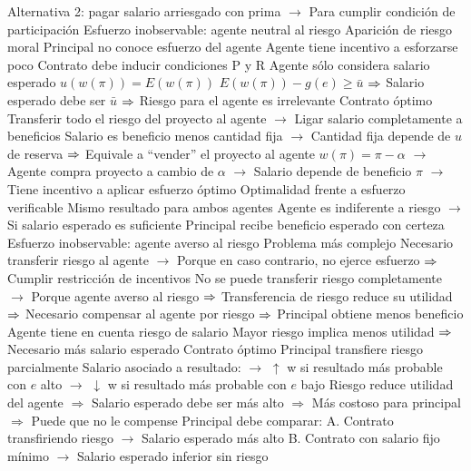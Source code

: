 \documentclass{nuevotema}
\begin{document}
\begin{esquemal}
				\4[] Alternativa 2: pagar salario arriesgado con prima
				\4[] $\to$ Para cumplir condición de participación
			\3 Esfuerzo inobservable: agente neutral al riesgo
				\4 Aparición de riesgo moral
				\4[] Principal no conoce esfuerzo del agente
				\4[] Agente tiene incentivo a esforzarse poco
				\4[$\then$] Contrato debe inducir condiciones P y R
				\4 Agente sólo considera salario esperado
				\4[] $u(w(\pi)) = E(w(\pi))$
				\4[] $E(w(\pi)) - g(e) \ge \bar{u}$
				\4[] $\then$ Salario esperado debe ser $\bar{u}$
				\4[] $\then$ Riesgo para el agente es irrelevante
				\4 Contrato óptimo
				\4[] Transferir todo el riesgo del proyecto al agente
				\4[] $\to$ Ligar salario completamente a beneficios
				\4[] Salario es beneficio menos cantidad fija
				\4[] $\to$ Cantidad fija depende de $u$ de reserva
				\4[] $\then$ Equivale a ``vender'' el proyecto al agente
				\4[] $w(\pi) = \pi - \alpha$
				\4[] $\to$ Agente compra proyecto a cambio de $\alpha$
				\4[] $\to$ Salario depende de beneficio $\pi$
				\4[] $\to$ Tiene incentivo a aplicar esfuerzo óptimo
				\4 Optimalidad frente a esfuerzo verificable
				\4[] Mismo resultado para ambos agentes
				\4[] Agente es indiferente a riesgo
				\4[] $\to$ Si salario esperado es suficiente
				\4[] Principal recibe beneficio esperado con certeza
			\3 Esfuerzo inobservable: agente averso al riesgo
				\4 Problema más complejo
				\4[] Necesario transferir riesgo al agente
				\4[] $\to$ Porque en caso contrario, no ejerce esfuerzo
				\4[] $\then$ Cumplir restricción de incentivos
				\4[] No se puede transferir riesgo completamente
				\4[] $\to$ Porque agente averso al riesgo
				\4[] $\then$ Transferencia de riesgo reduce su utilidad
				\4[] $\then$ Necesario compensar al agente por riesgo
				\4[] $\then$ Principal obtiene menos beneficio
				\4 Agente tiene en cuenta riesgo de salario
				\4[] Mayor riesgo implica menos utilidad
				\4[] $\then$ Necesario más salario esperado
				\4 Contrato óptimo
				\4[] Principal transfiere riesgo parcialmente
				\4[] Salario asociado a resultado:
				\4[] $\to$ $\uparrow$ w si resultado más probable con $e$ alto
				\4[] $\to$ $\downarrow$ w si resultado más probable con $e$ bajo
				\4[] Riesgo reduce utilidad del agente
				\4[] $\Rightarrow$ Salario esperado debe ser más alto
				\4[] $\Rightarrow$ Más costoso para principal
				\4[] $\Rightarrow$ Puede que no le compense
				\4[] Principal debe comparar:
				\4[] A. Contrato transfiriendo riesgo
				\4[] $\to$ Salario esperado más alto
				\4[] B. Contrato con salario fijo mínimo
				\4[] $\to$ Salario esperado inferior sin riesgo

\end{esquemal}
\end{document}
